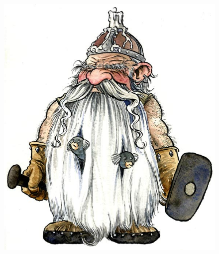 \documentclass[]{article}
\begin{document}
\begin{figure}[h!]
\centering
\includegraphics[scale=.5]{Illustration2}
\end{figure}
\end{document}
